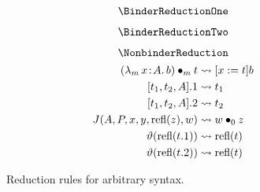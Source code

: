
\begin{figure}
    \centering
    \begin{minipage}{0.5\textwidth}
        $$\BinderReductionOne$$
    \end{minipage}%
    \begin{minipage}{0.5\textwidth}
        $$\BinderReductionTwo$$
    \end{minipage}%
    $$\NonbinderReduction$$
    \begin{align*}
        ({\lambda_m}\, x\! : \! A.\, b) \bullet_{m} t &\rightsquigarrow [x := t]b \\
        [t_1, t_2, A].1 &\rightsquigarrow t_1 \\
        [t_1, t_2, A].2 &\rightsquigarrow t_2 \\
        J(A, P, x, y, \text{refl}(z), w) &\rightsquigarrow w \bullet_{0} z \\
        \vartheta(\text{refl}(t.1)) &\rightsquigarrow \text{refl}(t) \\
        \vartheta(\text{refl}(t.2)) &\rightsquigarrow \text{refl}(t) \\
    \end{align*}
    \caption{Reduction rules for arbitrary syntax.}
\end{figure}


